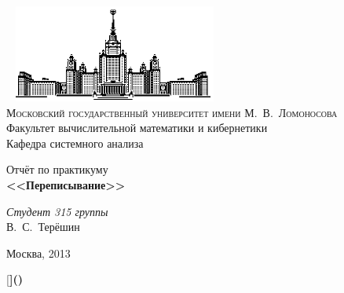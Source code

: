 \documentclass[11pt]{article}
\begin{document}
\thispagestyle{empty}

\begin{center}
\ \vspace{-3cm} \newline
\includegraphics[width=0.5\textwidth]{msu.eps}\\
{\scshape Московский государственный университет имени М.~В.~Ломоносова}\\
Факультет вычислительной математики и кибернетики\\
Кафедра системного анализа

\vfill
{\LARGE Отчёт по практикуму} \\
{\Huge\bfseries <<Переписывание>>}
\end{center}

\vspace{1cm}
\begin{flushright}
\large
\textit{Студент 315 группы}\\
В.~С.~Терёшин\\
\end{flushright}

\vfill
\begin{center}
Москва, 2013
\end{center}

\pagebreak
{}[\textbf]{\textbf(}{\textbf)}
\end{document}

